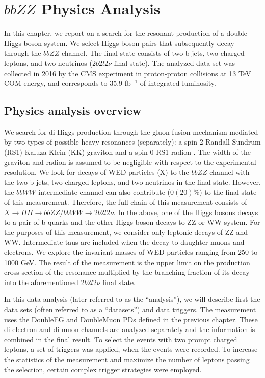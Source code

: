 \chapter{$bbZZ$ Physics Analysis}

In this chapter, we report on a search for the resonant production of a double Higgs boson system. We select Higgs boson pairs that subsequently decay through the $bbZZ$ channel. The final state consists of two b jets, two charged leptons, and two neutrinos ($2 b 2 l 2 \nu$ final state). The analyzed data set was collected in 2016 by the CMS experiment in proton-proton collisions at 13 TeV COM energy, and corresponds to 35.9 fb$^{-1}$ of integrated luminosity. 

\section{Physics analysis overview}
\label{sec:an_overview}

We search for di-Higgs production through the gluon fusion mechanism mediated by two types of possible heavy resonances (separately): a spin-2 Randall-Sundrum (RS1) Kaluza-Klein (KK) graviton and a spin-0 RS1 radion \cite{WED, Xanda}. The width of the graviton and radion is assumed to be negligible with respect to the experimental resolution. We look for decays of WED particles (X) to the $bbZZ$ channel with the two b jets, two charged leptons, and two neutrinos in the final state. However,  the $bbWW$ intermediate channel can also contribute ($0(20)\%$) to the final state of this measurement. Therefore, the full chain of this measurement consists of $X \rightarrow HH \rightarrow bbZZ/bbWW \rightarrow 2 b 2l 2 \nu$. In the above, one of the Higgs bosons decays to a pair of b quarks and the other Higgs boson decays to ZZ or WW system. For the purposes of this measurement, we consider only leptonic decays of ZZ and WW. Intermediate taus are included when the decay to daughter muons and electrons. We explore the invariant masses of WED particles ranging from 250 to 1000 GeV. The result of the measurement is the upper limit on the production cross section of the resonance multiplied by the branching fraction of its decay into the aforementioned $2 b 2 l 2 \nu$ final state. 

In this data analysis (later referred to as the ``analysis''), we will describe first the data sets (often referred to as a ``datasets'') and data triggers. The measurement uses the DoubleEG and DoubleMuon PDs defined in the previous chapter. These di-electron and di-muon channels are analyzed separately and the information is combined in the final result. To select the events with two prompt charged leptons, a set of triggers was applied, when the events were recorded. To increase the statistics of the measurement and maximize the number of leptons passing the selection, certain complex trigger strategies were employed. 

